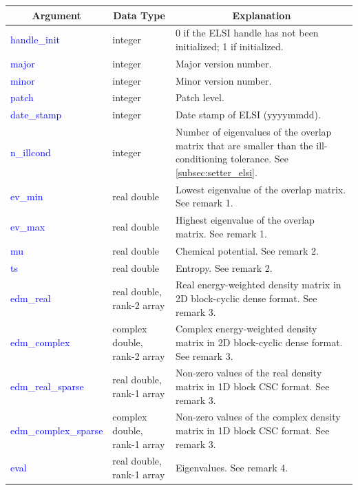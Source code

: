\documentclass{report}
\newcommand{\tcb}[1]{\textcolor{blue}{#1}}
\begin{document}
\begin{tabular}[]{|p{30mm}|p{45mm}|p{90mm}|}
\hline
\multicolumn{1}{|c|}{\textbf{Argument}} & \multicolumn{1}{c|}{\textbf{Data Type}} & \multicolumn{1}{c|}{\textbf{Explanation}}\\
\hline
\tcb{handle\_init}         & integer                      & 0 if the ELSI handle has not been initialized; 1 if initialized.\\
\hline
\tcb{major}                & integer                      & Major version number.\\
\hline
\tcb{minor}                & integer                      & Minor version number.\\
\hline
\tcb{patch}                & integer                      & Patch level.\\
\hline
\tcb{date\_stamp}          & integer                      & Date stamp of ELSI (yyyymmdd).\\
\hline
\tcb{n\_illcond}           & integer                      & Number of eigenvalues of the overlap matrix that are smaller than the ill-conditioning tolerance. See \ref{subsec:setter_elsi}.\\
\hline
\tcb{ev\_min}              & real double                  & Lowest eigenvalue of the overlap matrix. See remark 1.\\
\hline
\tcb{ev\_max}              & real double                  & Highest eigenvalue of the overlap matrix. See remark 1.\\
\hline
\tcb{mu}                   & real double                  & Chemical potential. See remark 2.\\
\hline
\tcb{ts}                   & real double                  & Entropy. See remark 2.\\
\hline
\tcb{edm\_real}            & real double, rank-2 array    & Real energy-weighted density matrix in 2D block-cyclic dense format. See remark 3.\\
\hline
\tcb{edm\_complex}         & complex double, rank-2 array & Complex energy-weighted density matrix in 2D block-cyclic dense format. See remark 3.\\
\hline
\tcb{edm\_real\_sparse}    & real double, rank-1 array    & Non-zero values of the real density matrix in 1D block CSC format. See remark 3.\\
\hline
\tcb{edm\_complex\_sparse} & complex double, rank-1 array & Non-zero values of the complex density matrix in 1D block CSC format. See remark 3.\\
\hline
\tcb{eval}                 & real double, rank-1 array    & Eigenvalues. See remark 4.\\

\end{tabular}
\end{document}
